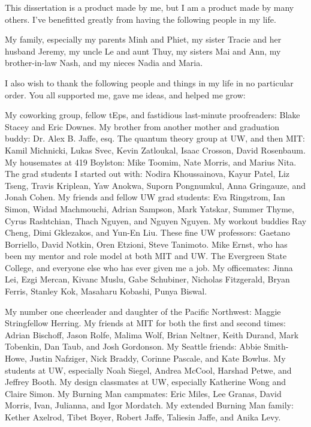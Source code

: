 This dissertation is a product made by me, but I am a product made by many others.
I've benefitted greatly from having the following people in my life.

My family, especially my parents Minh and Phiet, my sister Tracie and her husband Jeremy,
my uncle Le and aunt Thuy, my sisters Mai and Ann, my brother-in-law Nash,
and my nieces Nadia and Maria.

I also wish to thank the following people and things in my life in no particular order.
You all supported me, gave me ideas, and helped me grow:

My coworking group, fellow tEps, and fastidious last-minute proofreaders: Blake Stacey and Eric Downes.
My brother from another mother and graduation buddy: Dr. Alex B. Jaffe, esq.
The quantum theory group at UW, and then MIT: Kamil Michnicki, Lukas Svec, Kevin Zatloukal, Isaac Crosson, David Rosenbaum.
My housemates at 419 Boylston: Mike Toomim, Nate Morris, and Marius Nita.
The grad students I started out with: Nodira Khoussainova, Kayur Patel, Liz Tseng, Travis Kriplean, Yaw Anokwa, Suporn Pongnumkul, Anna Gringauze, and Jonah Cohen.
My friends and fellow UW grad students: Eva Ringstrom, Ian Simon, Widad Machmouchi, Adrian Sampson, Mark Yatskar, Summer Thyme, Cyrus Rashtchian, Thach Nguyen, and Nguyen Nguyen.
My workout buddies Ray Cheng, Dimi Gklezakos, and Yun-En Liu.
These fine UW professors: Gaetano Borriello, David Notkin, Oren Etzioni, Steve Tanimoto.
Mike Ernst, who has been my mentor and role model at both MIT and UW.
The Evergreen State College, and everyone else who has ever given me a job.
My officemates: Jinna Lei, Ezgi Mercan, Kivanc Muslu, Gabe Schubiner,
Nicholas Fitzgerald, Bryan Ferris, Stanley Kok, Masaharu Kobashi,
Punya Biswal.

My number one cheerleader and daughter of the Pacific Northwest: Maggie Stringfellow Herring.
My friends at MIT for both the first and second times:
Adrian Bischoff, Jason Rolfe,
Malima Wolf, Brian Neltner, Keith Durand, Mark Tobenkin, Dan Taub, and
Josh Gordonson.
My Seattle friends: Abbie Smith-Howe, Justin Nafziger, Nick Braddy, Corinne Pascale, and Kate Bowlus.
My students at UW, especially Noah Siegel, Andrea McCool, Harshad Petwe, and Jeffrey Booth.
My design classmates at UW, especially Katherine Wong and Claire Simon.
My Burning Man campmates: Eric Miles, Lee Granas, David Morris, Ivan, Julianna, and Igor Mordatch.
My extended Burning Man family: Kether Axelrod, Tibet Boyer, Robert Jaffe, Taliesin Jaffe, and Anika Levy.

